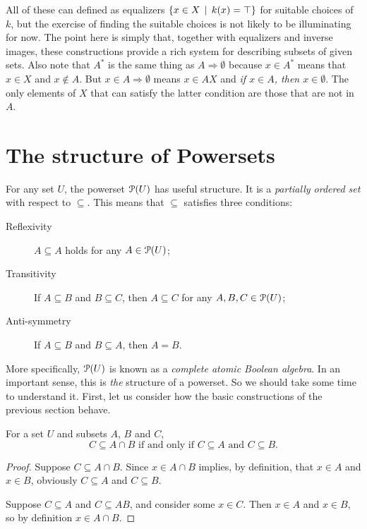 All of these can defined as equalizers $\{x\in X\,\mid\, k(x)=\top\}$ for suitable choices of $k$, but the exercise of finding the suitable choices is not likely to be illuminating for now. 
The point here is simply that, together with equalizers and inverse images, these constructions provide a rich system for describing subsets of given sets.
Also note that $A^*$ is the same thing as $A\Rightarrow\emptyset$ because $x\in A^*$ means that $x\in X$ and $x\notin A$.
But $x\in A\Rightarrow \emptyset$ means $x\in AX$ and \emph{if $x\in A$, then $x\in\emptyset$}.
The only elements of $X$ that can satisfy the latter condition are those that are not in $A$.

\section{The structure of Powersets}

For any set $U$, the powerset ${\mathcal{P}}(U)$ has useful structure.
It is a \emph{partially ordered set} with respect to $\subseteq$.
This means that $\subseteq$ satisfies three conditions:
\begin{description}
	\item[Reflexivity] $A\subseteq A$ holds for any $A\in {\mathcal{P}}(U)$;
	\item[Transitivity] If $A\subseteq B$ and $B\subseteq C$, then $A\subseteq C$ for any $A,B,C\in{\mathcal{P}}(U)$;
	\item[Anti-symmetry] If $A\subseteq B$ and $B\subseteq A$, then $A=B$. 
\end{description}

More specifically, ${\mathcal{P}}(U)$ is known as a \emph{complete atomic Boolean algebra}. In an important sense, this is \emph{the} structure of a powerset. So we
should take some time to understand it. First, let us consider how the basic
constructions of the previous section behave.

\begin{lemma}
	For a set $U$ and subsets $A$, $B$ and $C$,
	\[\text{$C\subseteq A\cap B$ if and only if $C\subseteq A$ and $C\subseteq B$.}\]
	
	\begin{proof}
		Suppose $C\subseteq A\cap B$.
		Since $x\in A\cap B$ implies, by definition,
		that $x\in A$ and $x\in B$, obviously $C\subseteq A$ and $C\subseteq B$.
		
		Suppose $C\subseteq A$ and $C\subseteq AB$, and consider some $x\in C$.
		Then $x\in A$ and $x\in B$, so by definition $x\in A\cap B$.
	\end{proof}
\end{lemma}

